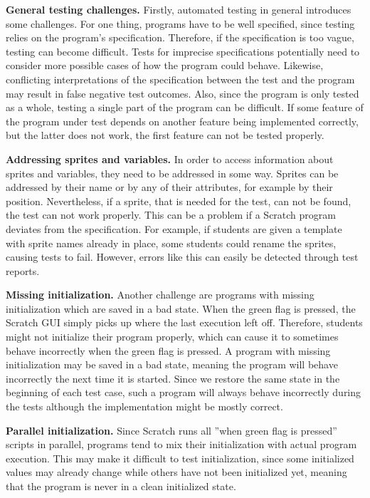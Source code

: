 \textbf{General testing challenges.}
Firstly, automated testing in general introduces some challenges.
For one thing, programs have to be well specified, since testing relies on the program's specification.
Therefore, if the specification is too vague, testing can become difficult.
Tests for imprecise specifications potentially need to consider more possible cases of how the program could behave.
Likewise, conflicting interpretations of the specification between the test and the program may result in false negative test outcomes.
Also, since the program is only tested as a whole, testing a single part of the program can be difficult.
If some feature of the program under test depends on another feature being implemented correctly,
but the latter does not work, the first feature can not be tested properly.
\parspace

\textbf{Addressing sprites and variables.}
In order to access information about sprites and variables, they need to be addressed in some way.
Sprites can be addressed by their name or by any of their attributes, for example by their position.
Nevertheless, if a sprite, that is needed for the test, can not be found, the test can not work properly.
This can be a problem if a Scratch program deviates from the specification.
For example, if students are given a template with sprite names already in place,
some students could rename the sprites, causing tests to fail.
However, errors like this can easily be detected through test reports.
\parspace

\textbf{Missing initialization.}
Another challenge are programs with missing initialization which are saved in a bad state.
When the green flag is pressed, the Scratch GUI simply picks up where the last execution left off.
Therefore, students might not initialize their program properly,
which can cause it to sometimes behave incorrectly when the green flag is pressed.
A program with missing initialization may be saved in a bad state,
meaning the program will behave incorrectly the next time it is started.
Since we restore the same state in the beginning of each test case,
such a program will always behave incorrectly during the tests although the implementation might be mostly correct.
\parspace

\textbf{Parallel initialization.}
Since Scratch runs all ''when green flag is pressed'' scripts in parallel,
programs tend to mix their initialization with actual program execution.
This may make it difficult to test initialization,
since some initialized values may already change while others have not been initialized yet,
meaning that the program is never in a clean initialized state.
\parspace

